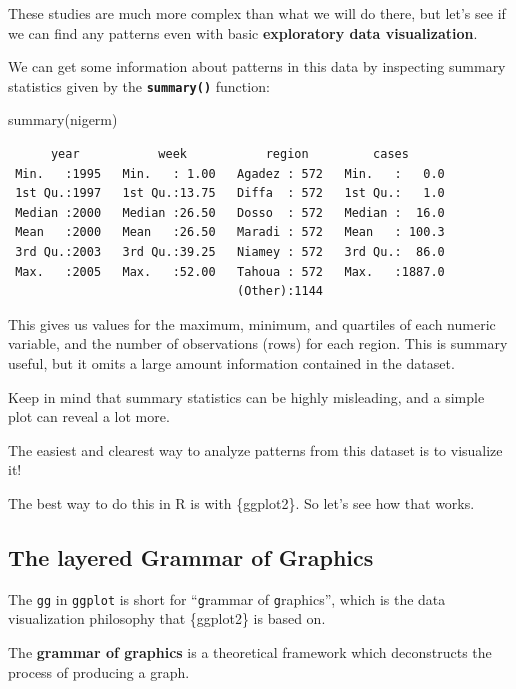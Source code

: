 \documentclass[
  letterpaper,
  DIV=11,
  numbers=noendperiod]{scrreprt}
\newenvironment{Shaded}{\begin{snugshade}}{\end{snugshade}}
\newcommand{\FunctionTok}[1]{\textcolor[rgb]{0.28,0.35,0.67}{#1}}
\newcommand{\NormalTok}[1]{\textcolor[rgb]{0.00,0.23,0.31}{#1}}
\begin{document}
These studies are much more complex than what we will do there, but
let's see if we can find any patterns even with basic
\textbf{exploratory data visualization}.

We can get some information about patterns in this data by inspecting
summary statistics given by the \textbf{\texttt{summary()}} function:

\begin{Shaded}
\begin{Highlighting}[]
\FunctionTok{summary}\NormalTok{(nigerm)}
\end{Highlighting}
\end{Shaded}

\begin{verbatim}
      year           week           region         cases       
 Min.   :1995   Min.   : 1.00   Agadez : 572   Min.   :   0.0  
 1st Qu.:1997   1st Qu.:13.75   Diffa  : 572   1st Qu.:   1.0  
 Median :2000   Median :26.50   Dosso  : 572   Median :  16.0  
 Mean   :2000   Mean   :26.50   Maradi : 572   Mean   : 100.3  
 3rd Qu.:2003   3rd Qu.:39.25   Niamey : 572   3rd Qu.:  86.0  
 Max.   :2005   Max.   :52.00   Tahoua : 572   Max.   :1887.0  
                                (Other):1144                   
\end{verbatim}

This gives us values for the maximum, minimum, and quartiles of each
numeric variable, and the number of observations (rows) for each region.
This is summary useful, but it omits a large amount information
contained in the dataset.

Keep in mind that summary statistics can be highly misleading, and a
simple plot can reveal a lot more.

The easiest and clearest way to analyze patterns from this dataset is to
visualize it!

The best way to do this in R is with \{ggplot2\}. So let's see how that
works.

\subsection{The layered Grammar of
Graphics}\label{the-layered-grammar-of-graphics}

The \texttt{gg} in \texttt{ggplot} is short for ``\texttt{g}rammar of
\texttt{g}raphics'', which is the data visualization philosophy that
\{ggplot2\} is based on.

The \textbf{grammar of graphics} is a theoretical framework which
deconstructs the process of producing a graph.
\end{document}

